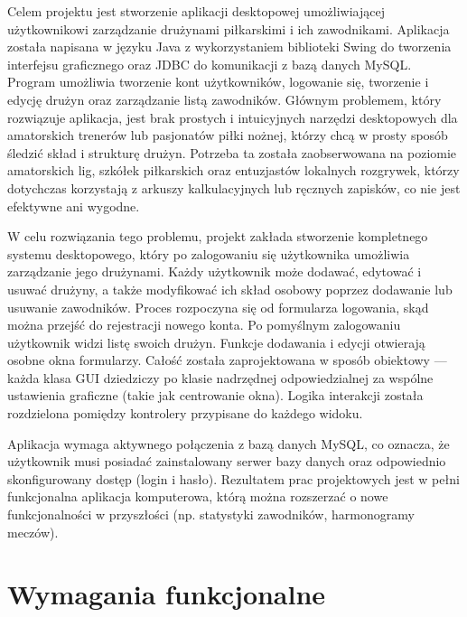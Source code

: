\documentclass{urdpl}     %
\begin{document}
Celem projektu jest stworzenie aplikacji desktopowej umożliwiającej użytkownikowi zarządzanie drużynami piłkarskimi i ich zawodnikami. Aplikacja została napisana w języku Java z wykorzystaniem biblioteki Swing do tworzenia interfejsu graficznego oraz JDBC do komunikacji z bazą danych MySQL. Program umożliwia tworzenie kont użytkowników, logowanie się, tworzenie i edycję drużyn oraz zarządzanie listą zawodników. Głównym problemem, który rozwiązuje aplikacja, jest brak prostych i intuicyjnych narzędzi desktopowych dla amatorskich trenerów lub pasjonatów piłki nożnej, którzy chcą w prosty sposób śledzić skład i strukturę drużyn. Potrzeba ta została zaobserwowana na poziomie amatorskich lig, szkółek piłkarskich oraz entuzjastów lokalnych rozgrywek, którzy dotychczas korzystają z arkuszy kalkulacyjnych lub ręcznych zapisków, co nie jest efektywne ani wygodne.

W celu rozwiązania tego problemu, projekt zakłada stworzenie kompletnego systemu desktopowego, który po zalogowaniu się użytkownika umożliwia zarządzanie jego drużynami. Każdy użytkownik może dodawać, edytować i usuwać drużyny, a także modyfikować ich skład osobowy poprzez dodawanie lub usuwanie zawodników. Proces rozpoczyna się od formularza logowania, skąd można przejść do rejestracji nowego konta. Po pomyślnym zalogowaniu użytkownik widzi listę swoich drużyn. Funkcje dodawania i edycji otwierają osobne okna formularzy. Całość została zaprojektowana w sposób obiektowy — każda klasa GUI dziedziczy po klasie nadrzędnej odpowiedzialnej za wspólne ustawienia graficzne (takie jak centrowanie okna). Logika interakcji została rozdzielona pomiędzy kontrolery przypisane do każdego widoku.

Aplikacja wymaga aktywnego połączenia z bazą danych MySQL, co oznacza, że użytkownik musi posiadać zainstalowany serwer bazy danych oraz odpowiednio skonfigurowany dostęp (login i hasło). Rezultatem prac projektowych jest w pełni funkcjonalna aplikacja komputerowa, którą można rozszerzać o nowe funkcjonalności w przyszłości (np. statystyki zawodników, harmonogramy meczów).

\section{Wymagania funkcjonalne}
\end{document}
